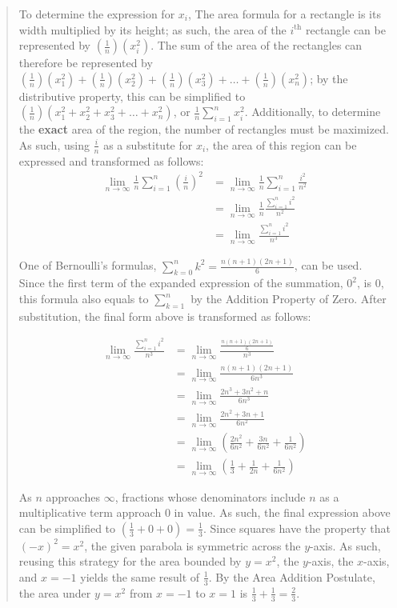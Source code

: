 \documentclass[letterpaper,12pt,twoside]{report}
\begin{document}
\begin{quotation}
		To determine the expression for $x_i$, The area formula for a rectangle is its width multiplied by its height; as such, the area of the $i^\text{th}$ rectangle can be represented by $(\frac{1}{n})(x_i^2)$. The sum of the area of the rectangles can therefore be represented by $(\frac{1}{n})(x_1^2)+(\frac{1}{n})(x_2^2)+(\frac{1}{n})(x_3^2)+\dots+(\frac{1}{n})(x_n^2)$; by the distributive property, this can be simplified to $(\frac{1}{n})(x_1^2+x_2^2+x_3^2+\dots+x_n^2)$, or $\frac{1}{n}\sum^n_{i=1} x_i^2$. Additionally, to determine the \textbf{exact} area of the region, the number of rectangles must be maximized. As such, using $\frac{i}{n}$ as a substitute for $x_i$, the area of this region can be expressed and transformed as follows:
		\begin{align*}
		\lim_{n\to\infty}\frac{1}{n}\sum^n_{i=1}(\frac{i}{n})^2 &= \lim_{n\to\infty}\frac{1}{n}\sum^n_{i=1}\frac{i^2}{n^2} \\
		&= \lim_{n\to\infty}\frac{1}{n}\frac{\sum^n_{i=1}i^2}{n^2} \\
		&= \lim_{n\to\infty}\frac{\sum^n_{i=1}i^2}{n^3}
		\end{align*} 
		
		One of Bernoulli's formulas, $\sum_{k=0}^{n}k^2=\frac{n(n+1)(2n+1)}{6}$, can be used. Since the first term of the expanded expression of the summation, $0^2$, is 0, this formula also equals to $\sum_{k=1}^{n}$ by the Addition Property of Zero. After substitution, the final form above is transformed as follows:
		
		\begin{align*}
		\lim_{n\to\infty}\frac{\sum^n_{i=1}i^2}{n^3}
		&= \lim_{n\to\infty}\frac{\frac{n(n+1)(2n+1)}{6}}{n^3} \\
		&= \lim_{n\to\infty}\frac{n(n+1)(2n+1)}{6n^3} \\
		&= \lim_{n\to\infty}\frac{2n^3+3n^2+n}{6n^3} \\
		&= \lim_{n\to\infty}\frac{2n^2+3n+1}{6n^2} \\
		&= \lim_{n\to\infty}(\frac{2n^2}{6n^2}+\frac{3n}{6n^2}+\frac{1}{6n^2}) \\
		&= \lim_{n\to\infty}(\frac{1}{3}+\frac{1}{2n}+\frac{1}{6n^2})
		\end{align*}
		
		As $n$ approaches $\infty$, fractions whose denominators include $n$ as a multiplicative term approach $0$ in value. As such, the final expression above can be simplified to $(\frac{1}{3}+0+0)=\frac{1}{3}$. Since squares have the property that $(-x)^2=x^2$, the given parabola is symmetric across the $y$-axis. As such, reusing this strategy for the area bounded by $y=x^2$, the $y$-axis, the $x$-axis, and $x=-1$ yields the same result of $\frac{1}{3}$. By the Area Addition Postulate, the area under $y=x^2$ from $x=-1$ to $x=1$ is $\frac{1}{3}+\frac{1}{3}=\frac{2}{3}$.
		

\end{quotation}
\end{document}
